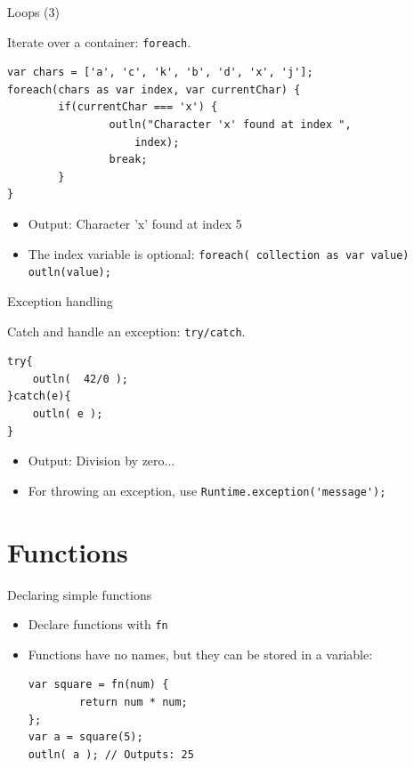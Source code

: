 \documentclass[ucs,9pt]{beamer}
\begin{document}
\begin{frame}[fragile]{Loops (3)}
	\begin{block}{Iterate over a container: \lstinline!foreach!.}
		\small	
		\begin{lstlisting}
var chars = ['a', 'c', 'k', 'b', 'd', 'x', 'j'];
foreach(chars as var index, var currentChar) {
		if(currentChar === 'x') {
				outln("Character 'x' found at index ", 
					index);
				break;
		}
}
		\end{lstlisting}
		\normalsize
	\end{block}
	\begin{itemize}	
	\item Output: Character 'x' found at index 5
	\item The index variable is optional:
	 \lstinline!foreach( collection as var value) outln(value);!
	\end{itemize}
\end{frame}


\begin{frame}[fragile]{Exception handling}
	\begin{block}{Catch and handle an exception: \lstinline!try/catch!.}
		\small	
		\begin{lstlisting}
try{
    outln(  42/0 );
}catch(e){
    outln( e );
}
		\end{lstlisting}
		\normalsize
	\end{block}
	\begin{itemize}	
	\item Output: Division by zero...
	\item For throwing an exception, use \lstinline!Runtime.exception('message');!
	\end{itemize}
\end{frame}

\section{Functions}
\begin{frame}[fragile]{Declaring simple functions}
	\begin{itemize}
	\item Declare functions with \lstinline!fn!
	\item Functions have no names, but they can be stored in a variable:
		\begin{lstlisting}
var square = fn(num) {
		return num * num;
};
var a = square(5);
outln( a ); // Outputs: 25
		\end{lstlisting}
		\end{itemize}
\end{frame}
\end{document}
